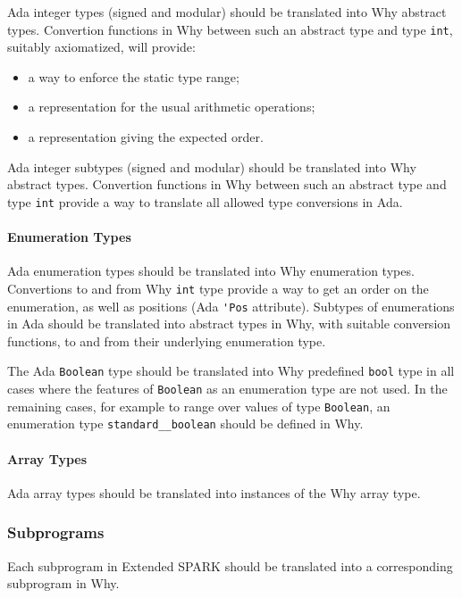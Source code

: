 \documentclass{article}
\newcounter{example}
\begin{document}
Ada integer types (signed and modular) should be translated into Why abstract
types. Convertion functions in Why between such an abstract type and type
\verb|int|, suitably axiomatized, will provide:
\begin{itemize}
\item a way to enforce the static type range;
\item a representation for the usual arithmetic operations;
\item a representation giving the expected order.
\end{itemize}

Ada integer subtypes (signed and modular) should be translated into Why
abstract types. Convertion functions in Why between such an abstract type and
type \verb|int| provide a way to translate all allowed type conversions in Ada.
 
\paragraph{Enumeration Types}

Ada enumeration types should be translated into Why enumeration
types. Convertions to and from Why \verb|int| type provide a way to get an
order on the enumeration, as well as positions (Ada \verb|'Pos|
attribute). Subtypes of enumerations in Ada should be translated into abstract
types in Why, with suitable conversion functions, to and from their underlying
enumeration type.

The Ada \verb|Boolean| type should be translated into Why predefined
\verb|bool| type in all cases where the features of \verb|Boolean| as an
enumeration type are not used. In the remaining cases, for example to range
over values of type \verb|Boolean|, an enumeration type
\verb|standard__boolean| should be defined in Why.

\paragraph{Array Types}

Ada array types should be translated into instances of the Why array type. 

\subsubsection{Subprograms}

Each subprogram in Extended SPARK should be translated into a corresponding
subprogram in Why.
\end{document}
